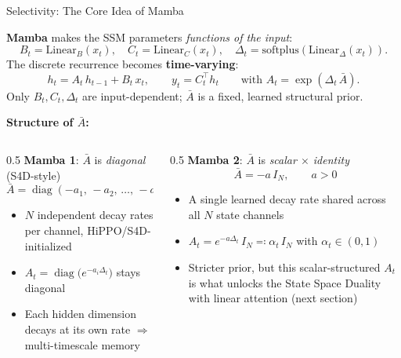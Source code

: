 \begin{frame}{Selectivity: The Core Idea of Mamba~\cite{gu2024mamba}}

  \textbf{Mamba} makes the SSM parameters \emph{functions of the input}:
  \[
    B_t = \text{Linear}_B(x_t), \quad C_t = \text{Linear}_C(x_t), \quad \Delta_t = \text{softplus}(\text{Linear}_\Delta(x_t)).
  \]
  The discrete recurrence becomes \textbf{time-varying}:
  \[
    \boxed{h_t = A_t\, h_{t-1} + B_t\, x_t, \qquad y_t = C_t^\top h_t}
    \qquad \text{with } A_t = \exp(\Delta_t\, \bar{A}).
  \]
  Only $B_t, C_t, \Delta_t$ are input-dependent; $\bar{A}$ is a fixed, learned structural prior.

  \vspace{0.3em}
  \textbf{Structure of $\bar{A}$:}

  \begin{columns}[T]
    \begin{column}{0.5\textwidth}
      \textbf{Mamba 1}: $\bar{A}$ is \emph{diagonal} (S4D-style)
      \[
        \bar{A} = \operatorname{diag}(-a_1,\, -a_2,\, \ldots,\, -a_N),\ a_i > 0
      \]
      \begin{itemize}
        \item $N$ independent decay rates per channel, HiPPO/S4D-initialized
        \item $A_t = \operatorname{diag}\!\bigl(e^{-a_i \Delta_t}\bigr)$ stays diagonal
        \item Each hidden dimension decays at its own rate $\Rightarrow$ multi-timescale memory
      \end{itemize}
    \end{column}
    \begin{column}{0.5\textwidth}
      \textbf{Mamba 2}: $\bar{A}$ is \emph{scalar $\times$ identity}
      \[
        \bar{A} = -a\, I_N,\qquad a > 0
      \]
      \begin{itemize}
        \item A single learned decay rate shared across all $N$ state channels
        \item $A_t = e^{-a \Delta_t}\, I_N \eqqcolon \alpha_t\, I_N$ with $\alpha_t \in (0,1)$
        \item Stricter prior, but this scalar-structured $A_t$ is what unlocks the State Space Duality with linear attention (next section)
      \end{itemize}
    \end{column}
  \end{columns}
\end{frame}

